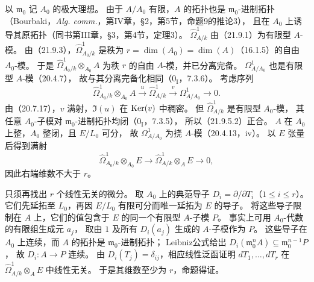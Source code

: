 \eproof
以 $\mathfrak m_0$ 记 $A_0$ 的极大理想。
由于 $A/A_0$ 有限，$A$ 的拓扑也是 $\mathfrak m_0$-进制拓扑
（Bourbaki，\textit{Alg. comm.}，第IV章，§2，第5节，命题9的推论3），
且在 $A_0$ 上诱导其原拓扑（同书第III章，§3，第4节，定理3）。
$\widehat\Omega^1_{A/k}$ 由（21.9.1）为有限型 $A$-模。
由（21.9.3），$\widehat\Omega^1_{A_0/k}$ 是秩为
$r=\dim(A_0)=\dim(A)$（16.1.5）的自由 $A_0$-模。
于是 $\widehat\Omega^1_{A_0/k}\otimes_{A_0}A$ 为秩 $r$ 的自由 $A$-模，并已分离完备。
$\Omega^1_{A/A_0}$ 也是有限型 $A$-模（20.4.7），
故与其分离完备化相同（$0_{\mathrm I}$，7.3.6）。
考虑序列
\begin{equation}
 \widehat\Omega^1_{A_0/k}\otimes_{A_0}A
 \xrightarrow{u}\widehat\Omega^1_{A/k}
 \xrightarrow{v}\Omega^1_{A/A_0}\longrightarrow0.
 \tag{21.9.5.2}
\end{equation}
由（20.7.17），$v$ 满射，$\Im(u)$ 在 $\operatorname{Ker}(v)$ 中稠密。
但 $\widehat\Omega^1_{A/k}$ 是有限型 $A_0$-模，
其任意 $A_0$-子模对 $\mathfrak m_0$-进制拓扑均闭（$0_{\mathrm I}$，7.3.5），
所以（21.9.5.2）正合。
$A$ 在 $A_0$ 上整，$A_0$ 整闭，且 $E/L_0$ 可分，
故 $\Omega^1_{A/A_0}$ 为挠 $A$-模（20.4.13，iv）。
以 $E$ 张量后得到满射
\[
 \widehat\Omega^1_{A_0/k}\otimes_{A_0}E
 \longrightarrow\widehat\Omega^1_{A/k}\otimes_AE\longrightarrow0,
\]
因此右端维数不大于 $r$。

只须再找出 $r$ 个线性无关的微分。
取 $A_0$ 上的典范导子 $D_i=\partial/\partial T_i$（$1\le i\le r$）。
它们先延拓至 $L_0$，再因 $E/L_0$ 有限可分而唯一延拓为 $E$ 的导子。
将这些导子限制在 $A$ 上，它们的值包含于 $E$ 的同一个有限型 $A$-子模 $P$。
事实上可用 $A_0$-代数的有限组生成元 $a_j$，
取由 $1$ 及所有 $D_i(a_j)$ 生成的 $A$-子模作为 $P$。
这些导子在 $A_0$ 上连续，而 $A$ 的拓扑是 $\mathfrak m_0$-进制拓扑；
Leibniz公式给出 $D_i(\mathfrak m_0^nA)\subseteq\mathfrak m_0^{n-1}P$，
故 $D_i:A\to P$ 连续。
由 $D_i(T_j)=\delta_{ij}$，相应线性泛函证明
$dT_1,\ldots,dT_r$ 在 $\widehat\Omega^1_{A/k}\otimes_AE$ 中线性无关。
于是其维数至少为 $r$，命题得证。
\finishproof
